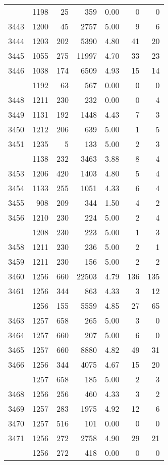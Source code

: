 \documentclass[
]{article}
\begin{document}
\begin{table}
\begin{tabular}[t]{lrrrrrr}
\addlinespace
3442 & 1198 & 25 & 359 & 0.00 & 0 & 0\\
3443 & 1200 & 45 & 2757 & 5.00 & 9 & 6\\
3444 & 1203 & 202 & 5390 & 4.80 & 41 & 20\\
3445 & 1055 & 275 & 11997 & 4.70 & 33 & 23\\
3446 & 1038 & 174 & 6509 & 4.93 & 15 & 14\\
\addlinespace
3447 & 1192 & 63 & 567 & 0.00 & 0 & 0\\
3448 & 1211 & 230 & 232 & 0.00 & 0 & 4\\
3449 & 1131 & 192 & 1448 & 4.43 & 7 & 3\\
3450 & 1212 & 206 & 639 & 5.00 & 1 & 5\\
3451 & 1235 & 5 & 133 & 5.00 & 2 & 3\\
\addlinespace
3452 & 1138 & 232 & 3463 & 3.88 & 8 & 4\\
3453 & 1206 & 420 & 1403 & 4.80 & 5 & 4\\
3454 & 1133 & 255 & 1051 & 4.33 & 6 & 4\\
3455 & 908 & 209 & 344 & 1.50 & 4 & 2\\
3456 & 1210 & 230 & 224 & 5.00 & 2 & 4\\
\addlinespace
3457 & 1208 & 230 & 223 & 5.00 & 1 & 3\\
3458 & 1211 & 230 & 236 & 5.00 & 2 & 1\\
3459 & 1211 & 230 & 156 & 5.00 & 2 & 2\\
3460 & 1256 & 660 & 22503 & 4.79 & 136 & 135\\
3461 & 1256 & 344 & 863 & 4.33 & 3 & 12\\
\addlinespace
3462 & 1256 & 155 & 5559 & 4.85 & 27 & 65\\
3463 & 1257 & 658 & 265 & 5.00 & 3 & 0\\
3464 & 1257 & 660 & 207 & 5.00 & 6 & 0\\
3465 & 1257 & 660 & 8880 & 4.82 & 49 & 31\\
3466 & 1256 & 344 & 4075 & 4.67 & 15 & 20\\
\addlinespace
3467 & 1257 & 658 & 185 & 5.00 & 2 & 3\\
3468 & 1256 & 256 & 460 & 4.33 & 3 & 2\\
3469 & 1257 & 283 & 1975 & 4.92 & 12 & 6\\
3470 & 1257 & 516 & 101 & 0.00 & 0 & 0\\
3471 & 1256 & 272 & 2758 & 4.90 & 29 & 21\\
\addlinespace
3472 & 1256 & 272 & 418 & 0.00 & 0 & 0\\

\end{tabular}
\end{table}
\end{document}
